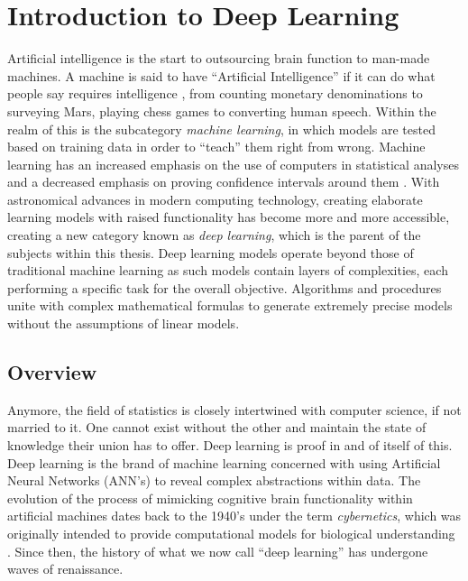 \chapter{Introduction to Deep Learning}

Artificial intelligence is the start to outsourcing brain function to man-made machines.  A machine is said to have ``Artificial Intelligence'' if it can do what people say requires intelligence \cite{jackson2019introduction}, from counting monetary denominations to surveying Mars, playing chess games to converting human speech.  Within the realm of this is the subcategory \textit{machine learning}, in which models are tested based on training data in order to ``teach'' them right from wrong.  Machine learning has an increased emphasis on the use of computers in statistical analyses and a decreased emphasis on proving confidence intervals around them \cite{Goodfellow-et-al-2016}.  With astronomical advances in modern computing technology, creating elaborate learning models with raised functionality has become more and more accessible, creating a new category known as \textit{deep learning}, which is the parent of the subjects within this thesis.  Deep learning models operate beyond those of traditional machine learning as such models contain layers of complexities, each performing a specific task for the overall objective.  Algorithms and procedures unite with complex mathematical formulas to generate extremely precise models without the assumptions of linear models.



\section{Overview} %

Anymore, the field of statistics is closely intertwined with computer science, if not married to it.  One cannot exist without the other and maintain the state of knowledge their union has to offer.  Deep learning is proof in and of itself of this.
Deep learning is the brand of machine learning concerned with using Artificial Neural Networks (ANN's) to reveal complex abstractions within data.
The evolution of the process of mimicking cognitive brain functionality within artificial machines dates back to the 1940's under the term \textit{cybernetics}, which was originally intended to provide computational models for biological understanding \cite{Goodfellow-et-al-2016}.  Since then, the history of what we now call ``deep learning'' has undergone waves of renaissance.  

